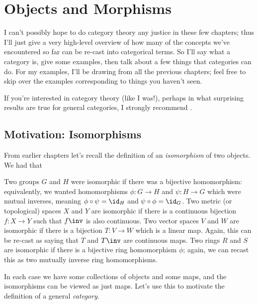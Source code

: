 \chapter{Objects and Morphisms}
I can't possibly hope to do category theory any justice in these few chapters;
thus I'll just give a very high-level overview of how many of the concepts we've
encountered so far can be re-cast into categorical terms.
So I'll say what a category is, give some examples,
then talk about a few things that categories can do.
For my examples, I'll be drawing from all the previous chapters;
feel free to skip over the examples corresponding to things you haven't seen.

If you're interested in category theory (like I was!), perhaps in
what surprising results are true for general categories, I strongly recommend \cite{ref:msci}.

\section{Motivation: Isomorphisms}
From earlier chapters let's recall the definition of an \emph{isomorphism} of two objects.
We had that
\begin{itemize}
	\ii Two groups $G$ and $H$ were isomorphic if there was a bijective homomorphism:
	equivalently, we wanted homomorphisms $\phi : G \to H$ and $\psi : H \to G$
	which were mutual inverses, meaning $\phi \circ \psi = \id_H$ and $\psi \circ \phi = \id_G$.
	\ii Two metric (or topological) spaces $X$ and $Y$ are isomorphic
	if there is a continuous bijection $f : X \to Y$ such that $f\inv$ is also continuous.
	\ii Two vector spaces $V$ and $W$ are isomorphic if there is a bijection $T : V \to W$
	which is a linear map.
	Again, this can be re-cast as saying that $T$ and $T\inv$ are continuous maps.
	\ii Two rings $R$ and $S$ are isomorphic if there is a bijective ring homomorphism $\phi$;
	again, we can recast this as two mutually inverse ring homomorphisms.
\end{itemize}

In each case we have some collections of objects and some maps,
and the isomorphisms can be viewed as just maps.
Let's use this to motivate the definition of a general \emph{category}.

